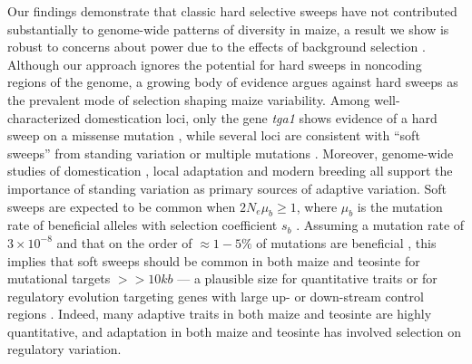\documentclass{pnastwo}
\begin{document}
\begin{article}
Our findings demonstrate that classic hard selective sweeps have not contributed substantially to genome-wide patterns of diversity in maize, a result we show is robust to concerns about power due to the effects of background selection  \cite{enard2014}. 
Although our approach ignores the potential for hard sweeps in noncoding regions of the genome, a growing body of evidence argues against hard sweeps as the prevalent mode of selection shaping maize variability. 
Among well-characterized domestication loci, only the gene \emph{tga1} shows evidence of a hard sweep on a missense mutation \cite{wang2015}, while several loci are consistent with ``soft sweeps''  from standing variation \cite{studer2011,gallavotti2004role} or multiple mutations \cite{wills2013}. 
Moreover, genome-wide studies of domestication \cite{hufford2012},  local adaptation \cite{Takuno15062015} and modern breeding \cite{van2012historical, beissinger2014} all support the importance of standing variation as primary sources of adaptive variation. 
Soft sweeps are expected to be common when $2N_e\mu_b \ge 1$, where $\mu_b$ is the mutation rate of beneficial alleles with selection coefficient $s_b$ \cite{messer2013}. Assuming a mutation rate of $3 \times 10^{-8}$ \cite{clark2005} and that on the order of $\approx 1-5\%$ of mutations are beneficial \cite{eyre2007}, this implies that soft sweeps should be common in both maize and teosinte for mutational targets $>>10kb$ --- a plausible size for quantitative traits or for regulatory evolution targeting genes with large up- or down-stream control regions \cite[e.g.]{studer2011}.
Indeed, many adaptive traits in both maize \cite{wallace2014} and teosinte \cite{weber2008} are highly quantitative,  and adaptation in both maize \cite{hufford2012} and teosinte \cite{pyhajarvi2013} has involved selection on regulatory variation.


\end{article}
\end{document}
